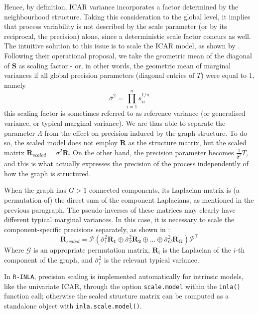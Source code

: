\documentclass[openany]{book}
\begin{document}
Hence, by definition, ICAR variance incorporates a factor determined by the neighbourhood structure. Taking this consideration to the global level, it implies that process variability is not described by the scale parameter (or by its reciprocal, the precision) alone, since a deterministic scale factor concurs as well. The intuitive solution to this issue is to scale the ICAR model, as shown by \cite{Sorbye}. Following their operational proposal, we take the geometric mean of the diagonal of $\mathbf{S}$ as scaling factor - or, in other words, the geometric mean of marginal variances if all global precision parameters (diagonal entries of $T$) were equal to 1, namely
$$
\bar{\sigma}^{2} = \prod_{i=1}^{n} s_{ii}^{1/n}
$$
this scaling factor is sometimes referred to as reference variance (or generalised variance, 
or typical marginal variance). We are thus able to separate the parameter $\Lambda$ from the effect on precision induced by the graph structure. To do so, the scaled model does not employ $\mathbf{R}$ as the structure matrix, but the scaled matrix $\mathbf{R}_{scaled} = \bar{\sigma}^2 \mathbf{R} $. On the other hand, the precision parameter becomes $ \displaystyle{\frac{1}{\bar{\sigma}^2}} T$, and this is what actually expresses the precision of the process independently of how the graph is structured. 


When the graph has $G >1$ connected components, its Laplacian matrix is (a permutation of) the direct sum of the component Laplacians, as mentioned in the previous paragraph. The pseudo-inverses of these matrices may clearly have different typical marginal variances. In this case, it is necessary to scale the component-specific precisions separately, as shown in \cite{Freni}:
$$
\mathbf{R}_{scaled} = \mathcal{P} \left( \bar{\sigma}_1^2 \mathbf{R_1} \oplus \bar{\sigma}_2^2 \mathbf{R_2}
\oplus ... \oplus \bar{\sigma}_G^2 \mathbf{R_G} \right) \mathcal{P^{\top}}
$$
Where $\mathcal{G}$ is an appropriate permutation matrix, $\mathbf{R_i}$ is the Laplacian of the $i$-th component of the graph, and $\bar{\sigma}_i^2$ is the relevant typical variance.


In \texttt{R-INLA}, precision scaling is implemented automatically for intrinsic models, like the univariate ICAR, through the option \texttt{scale.model} within the \texttt{inla()} function call; otherwise the scaled structure matrix can be computed as a standalone object with \texttt{inla.scale.model()}.
\end{document}
